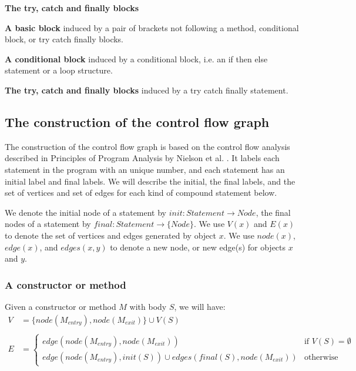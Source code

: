 \begin{labeling}{\textbf{The try, catch and finally blocks}}
    \item[\textbf{A basic block}] induced by a pair of brackets not following a method,
    conditional block, or try catch finally blocks.
    \item[\textbf{A conditional block}] induced by a conditional block, i.e. an if then 
    else statement or a loop structure.
    \item[\textbf{The try, catch and finally blocks}] induced by a try catch finally statement.
\end{labeling}

\subsection{The construction of the control flow graph}
The construction of the control flow graph is based on the control flow analysis
described in Principles of Program Analysis by Nielson et al. 
\cite{nielson2015principles}. It labels each statement in the program with an unique
number, and each statement has an initial label and final labels. We will describe 
the initial, the final labels, and the set of vertices and set of edges for each 
kind of compound statement below. 

We denote the initial node of a statement by $init : Statement \rightarrow Node$, the 
final nodes of a statement by $final : Statement \rightarrow \{Node\}$. 
We use $V(x)$ and $E(x)$ to denote the set of vertices and edges generated by object
$x$. We use $node(x)$, $edge(x)$, and $edges(x, y)$ to denote a new node, or new 
edge(s) for objects $x$ and $y$.

\subsubsection*{A constructor or method}
Given a constructor or method $M$ with body $S$, we will have:
\begin{align*}
    V &=\{node(M_{entry}), node(M_{exit})\} \cup V(S) \\ \\
    E &=
    \begin{cases}
      edge(node(M_{entry}), node(M_{exit}))                               & \text{if } V(S) = \emptyset \\
      edge(node(M_{entry}), init(S)) \cup edges(final(S), node(M_{exit})) & \text{otherwise}
    \end{cases}
\end{align*}

